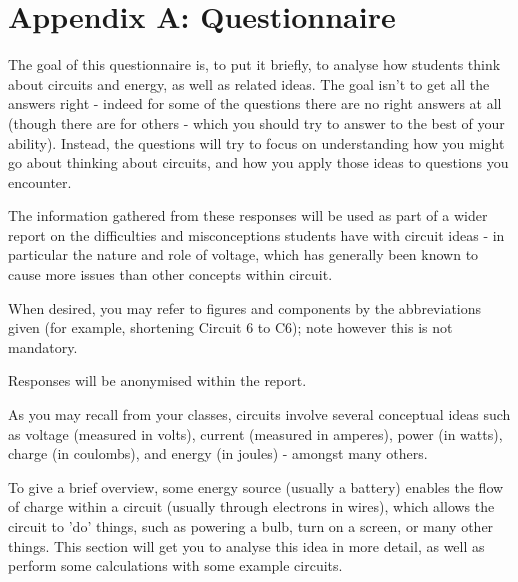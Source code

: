 \documentclass[a4paper,openany,nobib]{tufte-book}
\begin{document}
\chapter{Appendix A: Questionnaire}
The goal of this questionnaire is, to put it briefly, to analyse how students think about circuits and energy, as well as related ideas. The goal isn't to get all the answers right - indeed for some of the questions there are no right answers at all (though there are for others - which you should try to answer to the best of your ability). Instead, the questions will try to focus on understanding how you might go about thinking about circuits, and how you apply those ideas to questions you encounter.

The information gathered from these responses will be used as part of a wider report on the difficulties and misconceptions students have with circuit ideas - in particular the nature and role of voltage, which has generally been known to cause more issues than other concepts within circuit.

When desired, you may refer to figures and components by the abbreviations given (for example, shortening Circuit 6 to C6); note however this is not mandatory.

Responses will be anonymised within the report.


As you may recall from your classes, circuits involve several conceptual ideas such as voltage (measured in volts), current (measured in amperes), power (in watts), charge (in coulombs), and energy (in joules) - amongst many others. 

To give a brief overview, some energy source (usually a battery) enables the flow of charge within a circuit (usually through electrons in wires), which allows the circuit to 'do' things, such as powering a bulb, turn on a screen, or many other things. This section will get you to analyse this idea in more detail, as well as perform some calculations with some example circuits.
\end{document}
